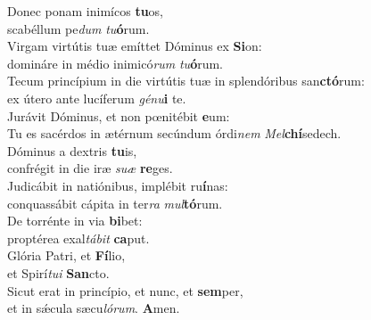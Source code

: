 \evenverse Donec ponam inimícos \textbf{tu}os,~\*\\
\evenverse scabéllum pe\textit{dum} \textit{tu}\textbf{ó}rum.\\
\oddverse Virgam virtútis tuæ emíttet Dóminus ex \textbf{Si}on:~\*\\
\oddverse domináre in médio inimicó\textit{rum} \textit{tu}\textbf{ó}rum.\\
\evenverse Tecum princípium in die virtútis tuæ in splendóribus san\textbf{ctó}rum:~\*\\
\evenverse ex útero ante lucíferum \textit{gé}\textit{nu}\textbf{i} te.\\
\oddverse Jurávit Dóminus, et non pœnitébit \textbf{e}um:~\*\\
\oddverse Tu es sacérdos in ætérnum secúndum órdi\textit{nem} \textit{Mel}\textbf{chí}sedech.\\
\evenverse Dóminus a dextris \textbf{tu}is,~\*\\
\evenverse confrégit in die iræ \textit{su}\textit{æ} \textbf{re}ges.\\
\oddverse Judicábit in natiónibus, implébit ru\textbf{í}nas:~\*\\
\oddverse conquassábit cápita in ter\textit{ra} \textit{mul}\textbf{tó}rum.\\
\evenverse De torrénte in via \textbf{bi}bet:~\*\\
\evenverse proptérea exal\textit{tá}\textit{bit} \textbf{ca}put.\\
\oddverse Glória Patri, et \textbf{Fí}lio,~\*\\
\oddverse et Spirí\textit{tu}\textit{i} \textbf{San}cto.\\
\evenverse Sicut erat in princípio, et nunc, et \textbf{sem}per,~\*\\
\evenverse et in sǽcula sæcu\textit{ló}\textit{rum}. \textbf{A}men.\\
